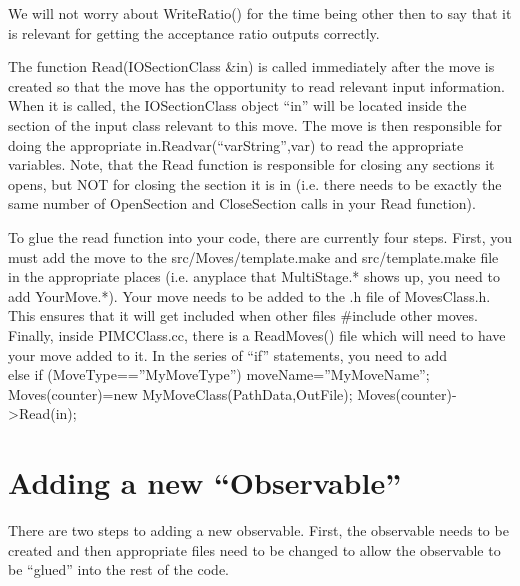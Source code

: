 \documentclass{book}
\begin{document}
We will not worry about WriteRatio() for the time being other then to
say that it is relevant for getting the acceptance ratio outputs
correctly.

The function Read(IOSectionClass &in) is called immediately after the
move is created so that the move has the opportunity to read relevant
input information.  When it is called, the IOSectionClass object
``in'' will be located inside the section of the input class relevant
to this move.  The move is then responsible for doing the appropriate
in.Readvar(``varString'',var) to read the appropriate variables. Note,
that the Read function is responsible for closing any sections it
opens, but NOT for closing the section it is in (i.e. there needs to
be exactly the same number of OpenSection and CloseSection calls in
your Read function).

To glue the read function into your code, there are currently four
steps. First, you must add the move to the src/Moves/template.make and
src/template.make file in the appropriate places (i.e. anyplace that
MultiStage.* shows up, you need to add YourMove.*).  Your move needs
to be added to the .h file of MovesClass.h. This ensures that it will
get included when other files #include other moves. Finally, inside
PIMCClass.cc, there is a ReadMoves() file which will need to have your
move added to it.  In the series of ``if'' statements, you need to add
\\
    else if (MoveType==''MyMoveType''){
      moveName=''MyMoveName'';
      Moves(counter)=new MyMoveClass(PathData,OutFile);
      Moves(counter)->Read(in);
    }



\section{Adding a new ``Observable''}
There are two steps to adding a new observable. First, the observable
needs to be created and then appropriate files need to be changed to
allow the observable to be ``glued'' into the rest of the code.
\end{document}
